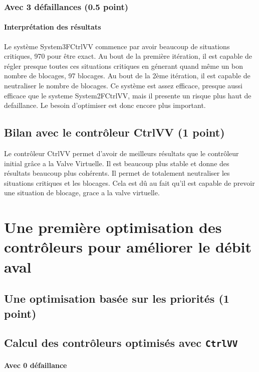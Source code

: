 \documentclass[a4paper]{book}
\begin{document}
\subsubsection{Avec 3 défaillances (0.5 point)}

\paragraph{Interprétation des résultats}
Le système System3FCtrlVV commence par avoir beaucoup de situations critiques, 970 pour être
exact. Au bout de la première itération, il est capable de régler presque toutes ces situations critiques
en génerant quand même un bon nombre de blocages, 97 blocages. Au bout de la 2ème itération, il est capable de
neutraliser le nombre de blocages. Ce système est assez efficace, presque aussi efficace que le systeme
System2FCtrlVV, mais il presente un risque plus haut de defaillance. Le besoin d'optimiser est donc encore plus
important.


\subsection{Bilan avec le contrôleur CtrlVV (1 point)}
Le contrôleur CtrlVV permet d'avoir de meilleurs résultats que le contrôleur initial
grâce a la Valve Virtuelle. Il est beaucoup plus stable et donne des résultats beaucoup plus cohérents.
Il permet de totalement neutraliser les situations critiques et les blocages. Cela est dû au fait qu'il
est capable de prevoir une situation de blocage, grace a la valve virtuelle.

\section{Une première optimisation des contrôleurs pour améliorer le débit aval}
\subsection{Une optimisation basée sur les priorités (1 point)}
\small{}

\subsection{Calcul des contrôleurs optimisés avec {\tt CtrlVV}}
\paragraph{Avec 0 défaillance}\ \\

\end{document}

